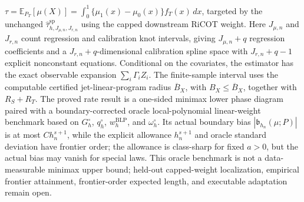 \(\tau=\mathbb E_{P_T}[\mu(X)]=\int_0^1\{\mu_1(x)-\mu_0(x)\}f_T(x)\,dx\), targeted by the unchanged \(\widehat\tau^{\mathrm{sp}}_{h,J_{\mu,n},J_{r,n}}\) using the capped downstream RiCOT weight. Here \(J_{\mu,n}\) and \(J_{r,n}\) count regression and calibration knot intervals, giving \(J_{\mu,n}+q\) regression coefficients and a \(J_{r,n}+q\)-dimensional calibration spline space with \(J_{r,n}+q-1\) explicit nonconstant equations. Conditional on the covariates, the estimator has the exact observable expansion \(\sum_i\Gamma_i Z_i\). The finite-sample interval uses the computable certified jet-linear-program radius \(\overline B_X\), with \(B_X\le\overline B_X\), together with \(R_S+R_T\). The proved rate result is a one-sided minimax lower phase diagram paired with a boundary-corrected oracle local-polynomial linear-weight benchmark based on \(G_h^{\circ}\), \(q_h^{\circ}\), \(w_h^{\mathrm{BLP}}\), and \(\omega_h^{\circ}\). Its actual boundary bias \(|\mathfrak b_{h_n}(\mu;P)|\) is at most \(C h_n^{s+1}\), while the explicit allowance \(h_n^{s+1}\) and oracle standard deviation have frontier order; the allowance is class-sharp for fixed \(a>0\), but the actual bias may vanish for special laws. This oracle benchmark is not a data-measurable minimax upper bound; held-out capped-weight localization, empirical frontier attainment, frontier-order expected length, and executable adaptation remain open.